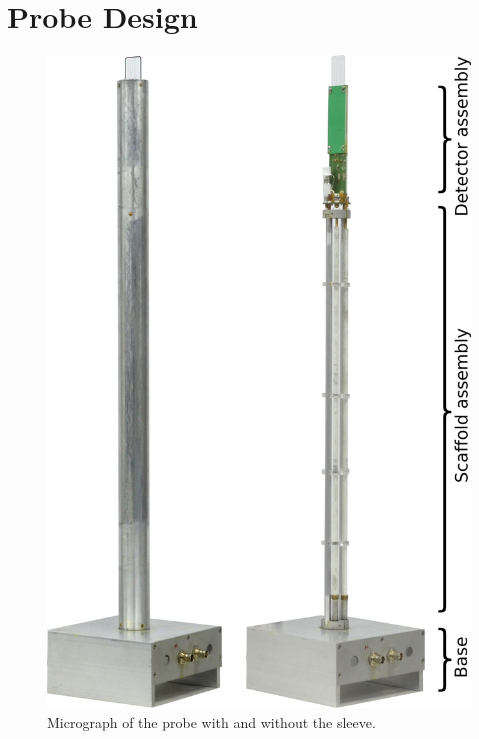 \documentclass[preprint,12pt]{article}
\begin{document}
\section{Probe Design}
\label{sec:probe-design}
\begin{figure}
\centering
\includegraphics[width=.5\linewidth,keepaspectratio=true]{./figures/ms5n17-tlp-im-181218-probe.png} 
\caption{Micrograph of the probe with and without the sleeve.}
\label{fig:probe} 
\end{figure}
\end{document}
